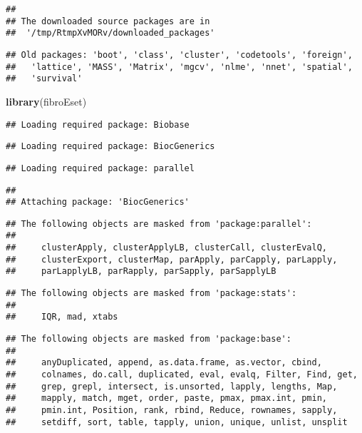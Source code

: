 \documentclass[]{article}
\newenvironment{Shaded}{\begin{snugshade}}{\end{snugshade}}
\newcommand{\KeywordTok}[1]{\textcolor[rgb]{0.13,0.29,0.53}{\textbf{{#1}}}}
\newcommand{\NormalTok}[1]{{#1}}
\begin{document}
\begin{verbatim}
## 
## The downloaded source packages are in
##  '/tmp/RtmpXvMORv/downloaded_packages'
\end{verbatim}

\begin{verbatim}
## Old packages: 'boot', 'class', 'cluster', 'codetools', 'foreign',
##   'lattice', 'MASS', 'Matrix', 'mgcv', 'nlme', 'nnet', 'spatial',
##   'survival'
\end{verbatim}

\begin{Shaded}
\begin{Highlighting}[]
\KeywordTok{library}\NormalTok{(fibroEset)}
\end{Highlighting}
\end{Shaded}

\begin{verbatim}
## Loading required package: Biobase
\end{verbatim}

\begin{verbatim}
## Loading required package: BiocGenerics
\end{verbatim}

\begin{verbatim}
## Loading required package: parallel
\end{verbatim}

\begin{verbatim}
## 
## Attaching package: 'BiocGenerics'
\end{verbatim}

\begin{verbatim}
## The following objects are masked from 'package:parallel':
## 
##     clusterApply, clusterApplyLB, clusterCall, clusterEvalQ,
##     clusterExport, clusterMap, parApply, parCapply, parLapply,
##     parLapplyLB, parRapply, parSapply, parSapplyLB
\end{verbatim}

\begin{verbatim}
## The following objects are masked from 'package:stats':
## 
##     IQR, mad, xtabs
\end{verbatim}

\begin{verbatim}
## The following objects are masked from 'package:base':
## 
##     anyDuplicated, append, as.data.frame, as.vector, cbind,
##     colnames, do.call, duplicated, eval, evalq, Filter, Find, get,
##     grep, grepl, intersect, is.unsorted, lapply, lengths, Map,
##     mapply, match, mget, order, paste, pmax, pmax.int, pmin,
##     pmin.int, Position, rank, rbind, Reduce, rownames, sapply,
##     setdiff, sort, table, tapply, union, unique, unlist, unsplit
\end{verbatim}
\end{document}
